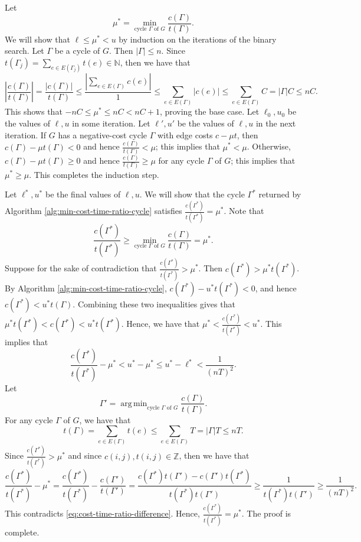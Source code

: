 \documentclass[letterpaper,reqno,12pt]{article}
\newcommand{\ZZ}{\mathbb{Z}}
\newcommand{\NN}{\mathbb{N}}
\DeclareMathOperator{\argmin}{arg\,min}
\begin{document}
\begin{exercise}
\begin{enumerate}
    Let
    $$ \mu^* = \min_\text{cycle $\Gamma$ of $G$} \frac{c(\Gamma)}{t(\Gamma)}. $$
    We will show that $\ell \leq \mu^* < u$ by induction on the iterations of the binary search. Let $\Gamma$ be a cycle of $G$. Then $|\Gamma| \leq n$. Since $t(\Gamma_j) = \sum_{e \in E(\Gamma_j)} t(e) \in \NN$, then we have that
    $$ \left|\frac{c(\Gamma)}{t(\Gamma)}\right| = \frac{|c(\Gamma)|}{t(\Gamma)} \leq \frac{\left|\sum_{e \in E(\Gamma)} c(e)\right|}{1} \leq \sum_{e \in E(\Gamma)} |c(e)| \leq \sum_{e \in E(\Gamma)} C = |\Gamma| C \leq nC. $$
    This shows that $-nC \leq \mu^* \leq nC < nC + 1$, proving the base case. Let $\ell_0, u_0$ be the values of $\ell, u$ in some iteration. Let $\ell', u'$ be the values of $\ell, u$ in the next iteration. If $G$ has a negative-cost cycle $\Gamma$ with edge costs $c - \mu t$, then $c(\Gamma) - \mu t(\Gamma) < 0$ and hence $\frac{c(\Gamma)}{t(\Gamma)} < \mu$; this implies that $\mu^* < \mu$. Otherwise, $c(\Gamma) - \mu t(\Gamma) \geq 0$ and hence $\frac{c(\Gamma)}{t(\Gamma)} \geq \mu$ for any cycle $\Gamma$ of $G$; this implies that $\mu^* \geq \mu$. This completes the induction step.

    Let $\ell^*, u^*$ be the final values of $\ell, u$. We will show that the cycle $\Gamma^*$ returned by Algorithm \ref{alg:min-cost-time-ratio-cycle} satisfies $\frac{c(\Gamma^*)}{t(\Gamma^*)} = \mu^*$. Note that
    $$ \frac{c\left(\Gamma^*\right)}{t\left(\Gamma^*\right)} \geq \min_\text{cycle $\Gamma$ of $G$} \frac{c(\Gamma)}{t(\Gamma)} = \mu^*. $$
    Suppose for the sake of contradiction that $\frac{c(\Gamma^*)}{t(\Gamma^*)} > \mu^*$. Then $c(\Gamma^*) > \mu^* t(\Gamma^*)$.
    By Algorithm \ref{alg:min-cost-time-ratio-cycle}, $c(\Gamma^*) - u^* t(\Gamma^*) < 0$, and hence $c(\Gamma^*) < u^* t(\Gamma)$. Combining these two inequalities gives that $\mu^* t(\Gamma^*) < c(\Gamma^*) < u^* t(\Gamma^*)$. Hence, we have that $\mu^* < \frac{c(\Gamma^*)}{t(\Gamma^*)} < u^*$. This implies that
    \begin{equation} \label{eq:cost-time-ratio-difference}
      \frac{c(\Gamma^*)}{t(\Gamma^*)} - \mu^* < u^* - \mu^* \leq u^* - \ell^* < \frac{1}{(nT)^2}.
    \end{equation}
    Let
    $$ \Gamma' = \argmin_\text{cycle $\Gamma$ of $G$} \frac{c(\Gamma)}{t(\Gamma)}. $$
    For any cycle $\Gamma$ of $G$, we have that
    $$ t(\Gamma) = \sum_{e \in E(\Gamma)} t(e) \leq \sum_{e \in E(\Gamma)} T = |\Gamma| T \leq nT. $$
    Since $\frac{c(\Gamma^*)}{t(\Gamma^*)} > \mu^*$ and since $c(i, j), t(i, j) \in \ZZ$, then we have that
    $$ \frac{c\left(\Gamma^*\right)}{t\left(\Gamma^*\right)} - \mu^* = \frac{c\left(\Gamma^*\right)}{t\left(\Gamma^*\right)} - \frac{c\left(\Gamma'\right)}{t\left(\Gamma'\right)} = \frac{c\left(\Gamma^*\right) t\left(\Gamma'\right) - c\left(\Gamma'\right) t\left(\Gamma^*\right)}{t\left(\Gamma^*\right) t\left(\Gamma'\right)} \geq \frac{1}{t\left(\Gamma^*\right) t\left(\Gamma'\right)} \geq \frac{1}{(nT)^2}. $$
    This contradicts \eqref{eq:cost-time-ratio-difference}. Hence, $\frac{c(\Gamma^*)}{t(\Gamma^*)} = \mu^*$. The proof is complete.
  \end{enumerate}
\end{exercise}
\end{document}
